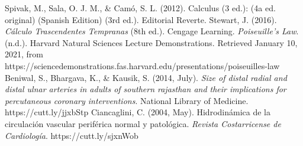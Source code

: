  
\begin{thebibliography}{0}
  Spivak, M., Sala, O. J. M., \& Camó, S. L. (2012). Calculus (3 ed.): (4a ed. original) (Spanish Edition) (3rd ed.). Editorial Reverte.
  Stewart, J. (2016). \textit{Cálculo Trascendentes Tempranas} (8th ed.). Cengage Learning.
  \textit{Poiseuille’s Law}. (n.d.). Harvard Natural Sciences Lecture Demonstrations. Retrieved January 10, 2021, from https://sciencedemonstrations.fas.harvard.edu/presentations/poiseuilles-law
  Beniwal, S., Bhargava, K., \& Kausik, S. (2014, July).\textit{ Size of distal radial and distal ulnar arteries in adults of southern rajasthan and their implications for percutaneous coronary interventions}. National Library of Medicine. https://cutt.ly/jjxbStp
  \bibitem{}Ciancaglini, C. (2004, May). Hidrodinámica de la circulación vascular periférica normal y patológica. \textit{Revista Costarricense de Cardiología}. https://cutt.ly/sjxnWob

\end{thebibliography}
